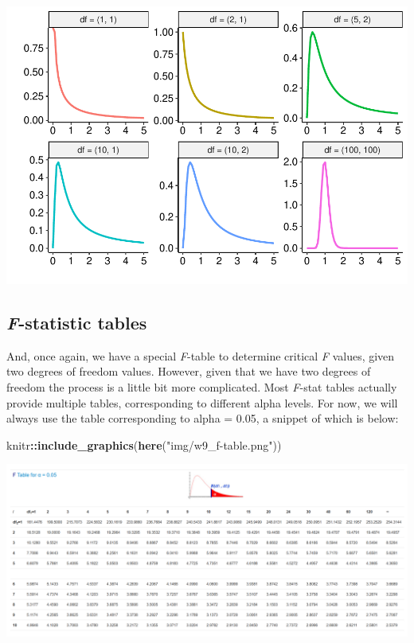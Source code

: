 \documentclass[
]{book}
\newenvironment{Shaded}{\begin{snugshade}}{\end{snugshade}}
\newcommand{\FunctionTok}[1]{\textcolor[rgb]{0.13,0.29,0.53}{\textbf{#1}}}
\newcommand{\NormalTok}[1]{#1}
\newcommand{\SpecialCharTok}[1]{\textcolor[rgb]{0.81,0.36,0.00}{\textbf{#1}}}
\newcommand{\StringTok}[1]{\textcolor[rgb]{0.31,0.60,0.02}{#1}}
\begin{document}
\includegraphics{_main_files/figure-latex/unnamed-chunk-152-1.pdf}

\hypertarget{f-statistic-tables}{%
\subsection{\texorpdfstring{\emph{F}-statistic tables}{F-statistic tables}}\label{f-statistic-tables}}

And, once again, we have a special \emph{F}-table to determine critical \emph{F}
values, given two degrees of freedom values. However, given that we have
two degrees of freedom the process is a little bit more complicated.
Most \emph{F}-stat tables actually provide multiple tables, corresponding to
different alpha levels. For now, we will always use the table
corresponding to alpha = 0.05, a snippet of which is below:

\begin{Shaded}
\begin{Highlighting}[]
\NormalTok{knitr}\SpecialCharTok{::}\FunctionTok{include\_graphics}\NormalTok{(}\FunctionTok{here}\NormalTok{(}\StringTok{"img/w9\_f{-}table.png"}\NormalTok{))}
\end{Highlighting}
\end{Shaded}

\includegraphics[width=29.76in]{img/w9_f-table}
\end{document}
